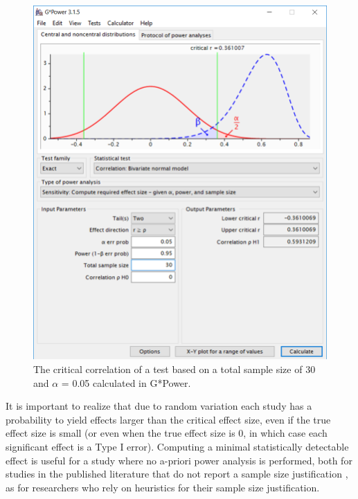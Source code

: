 \documentclass[
]{krantz}
\begin{document}
\begin{figure}

{\centering \includegraphics[width=1\linewidth]{images/gpowcrit2} 

}

\caption{The critical correlation of a test based on a total sample size of 30 and $\alpha$ = 0.05 calculated in G*Power.}\label{fig:gcrit2}
\end{figure}

It is important to realize that due to random variation each study has a probability to yield effects larger than the critical effect size, even if the true effect size is small (or even when the true effect size is 0, in which case each significant effect is a Type I error). Computing a minimal statistically detectable effect is useful for a study where no a-priori power analysis is performed, both for studies in the published literature that do not report a sample size justification \citep{lakens_equivalence_2018}, as for researchers who rely on heuristics for their sample size justification.
\end{document}
